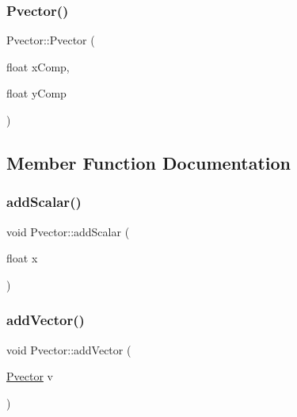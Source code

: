 \mbox{\label{class_pvector_ada1a9423d48f67838d625ddf62149bcf}} 
\subsubsection{\texorpdfstring{Pvector()}{Pvector()}\hspace{0.1cm}{\footnotesize\ttfamily [2/2]}}
{\footnotesize\ttfamily Pvector\+::\+Pvector (\begin{DoxyParamCaption}\item[{float}]{x\+Comp,  }\item[{float}]{y\+Comp }\end{DoxyParamCaption})\hspace{0.3cm}{\ttfamily [inline]}}



\subsection{Member Function Documentation}
\mbox{\label{class_pvector_ab130e1e66e4a33ecf370203e43de191c}} 
\subsubsection{\texorpdfstring{add\+Scalar()}{addScalar()}}
{\footnotesize\ttfamily void Pvector\+::add\+Scalar (\begin{DoxyParamCaption}\item[{float}]{x }\end{DoxyParamCaption})}

\mbox{\label{class_pvector_aacdb0c22529bdfa27907013843f78963}} 
\subsubsection{\texorpdfstring{add\+Vector()}{addVector()}}
{\footnotesize\ttfamily void Pvector\+::add\+Vector (\begin{DoxyParamCaption}\item[{\hyperlink{class_pvector}{Pvector}}]{v }\end{DoxyParamCaption})}

